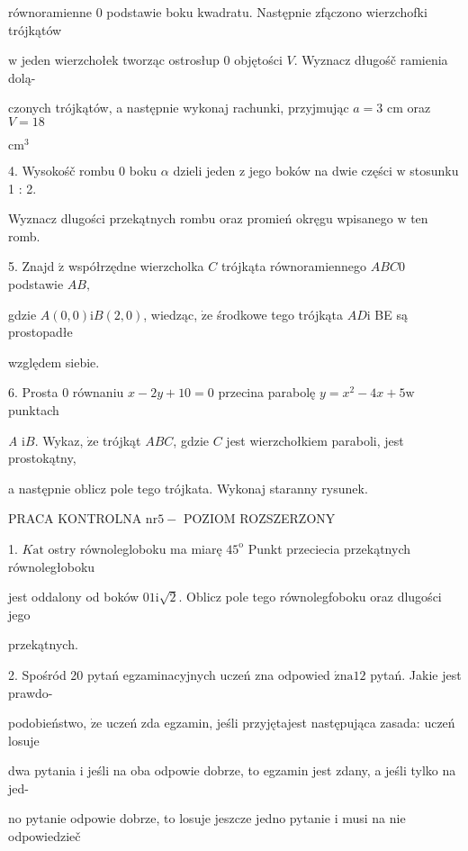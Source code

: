 \documentclass[a4paper,12pt]{article}
\begin{document}
równoramienne $0$ podstawie boku kwadratu. Następnie zfączono wierzchofki trójkątów

$\mathrm{w}$ jeden wierzchołek tworząc ostrosłup $0$ objętości $V$. Wyznacz długośč ramienia dolą-

czonych trójkątów, a następnie wykonaj rachunki, przyjmując $a=3$ cm oraz $V= 18$

$\mathrm{c}\mathrm{m}^{3}$

4. Wysokośč rombu $0$ boku $\alpha$ dzieli jeden $\mathrm{z}$ jego boków na dwie części $\mathrm{w}$ stosunku 1 : 2.

Wyznacz dlugości przekątnych rombu oraz promień okręgu wpisanego $\mathrm{w}$ ten romb.

5. Znajd $\acute{\mathrm{z}}$ współrzędne wierzcholka $C$ trójkąta równoramiennego $ABC0$ podstawie $AB,$

gdzie $A(0,0) \mathrm{i} B(2,0)$, wiedząc, $\dot{\mathrm{z}}\mathrm{e}$ środkowe tego trójkąta $AD \mathrm{i}$ BE są prostopadłe

względem siebie.

6. Prosta $0$ równaniu $x-2y+10 = 0$ przecina parabolę $y = x^{2}-4x+5\mathrm{w}$ punktach

{\it A} $\mathrm{i}B$. Wykaz, $\dot{\mathrm{z}}\mathrm{e}$ trójkąt $ABC$, gdzie $C$ jest wierzchołkiem paraboli, jest prostokątny,

a następnie oblicz pole tego trójkata. Wykonaj staranny rysunek.




PRACA KONTROLNA $\mathrm{n}\mathrm{r} 5-$ POZIOM ROZSZERZONY

1. $K\mathrm{a}\mathrm{t}$ ostry równolegloboku ma miarę $45^{\mathrm{o}}$ Punkt przeciecia przekątnych równoległoboku

jest oddalony od boków $0 1\mathrm{i}\sqrt{2}$. Oblicz pole tego równolegfoboku oraz dlugości jego

przekątnych.

2. Spośród 20 pytań egzaminacyjnych uczeń zna odpowied $\acute{\mathrm{z}}\mathrm{n}\mathrm{a}12$ pytań. Jakie jest prawdo-

podobieństwo, $\dot{\mathrm{z}}\mathrm{e}$ uczeń zda egzamin, jeśli przyjętajest następująca zasada: uczeń losuje

dwa pytania $\mathrm{i}$ jeśli na oba odpowie dobrze, to egzamin jest zdany, a jeśli tylko na jed-

no pytanie odpowie dobrze, to losuje jeszcze jedno pytanie $\mathrm{i}$ musi na nie odpowiedzieč
\end{document}
